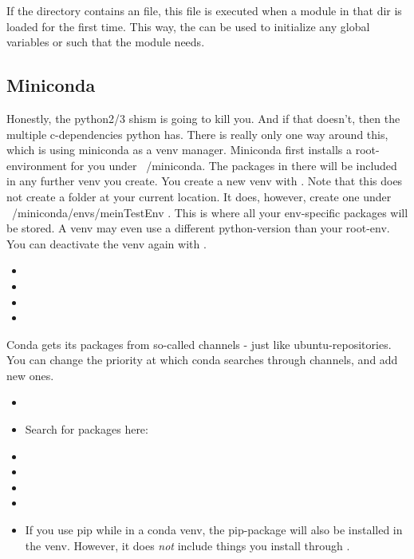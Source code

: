 If the directory  contains an  file, this file is executed when a module in that dir is loaded for the first time. This way, the  can be used to initialize any global variables or such that the module needs.




\subsection{Miniconda}
Honestly, the python2/3 shism is going to kill you. And if that doesn't, then the multiple c-dependencies python has. There is really only one way around this, which is using miniconda as a venv manager.
Miniconda first installs a root-environment for you under ~/miniconda. The packages in there will be included in any further venv you create. 
You create a new venv with . Note that this does not create a folder at your current location. It does, however, create one under ~/miniconda/envs/meinTestEnv . This is where all your env-specific packages will be stored. A venv may even use a different python-version than your root-env.
You can deactivate the venv again with .

\begin{itemize}
    \item {}
    \item {}
    \item {}
    \item {}
\end{itemize}

Conda gets its packages from so-called channels - just like ubuntu-repositories. You can change the priority at which conda searches through channels, and add new ones. 

\begin{itemize}
    \item {}
    \item Search for packages here: 
    \item {}
    \item {}
    \item {}
    \item {}
    \item If you use pip while in a conda venv, the pip-package will also be installed in the venv. However, it does \emph{not} include things you install through .
\end{itemize}


